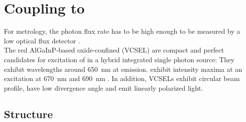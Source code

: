 
\section[VCSELs]{Coupling \sivs to \Vcsels} \label{sec::coupling_vcsel}

	For metrology, the photon flux rate has to be high enough to be measured by a low optical flux detector \cite{Vaigu2017}.
	\\
	The red AlGaInP-based oxide-confined \vcsels (VCSEL) are compact and perfect candidates for excitation of \sivs in a hybrid integrated single photon source: 
	They exhibit wavelengths around \SI{650}{nm} at \cw emission.
	\sivs exhibit intensity maxima at an excitation at \SI{670}{nm} and \SI{690}{nm} \cite{}. 
	In addition, VCSELs exhibit circular beam profile, have low divergence angle and emit linearly polarized light.

	\subsection{\Vcsel Structure}\label{subsec::vcsel_structure}

